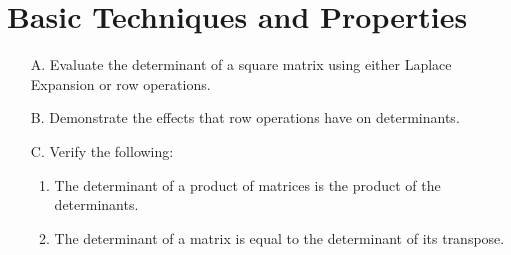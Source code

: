 \section{Basic Techniques and Properties}

\begin{outcome}

\begin{enumerate}
\item[A.] Evaluate the determinant of a square matrix using either Laplace Expansion or row operations.

\item[B.] Demonstrate the effects that row operations have on determinants.

\item[C.] Verify the following:

\begin{enumerate}
\item The determinant of a product of matrices is the product of the
determinants.

\item The determinant of a matrix is equal to the determinant of its
transpose.
\end{enumerate}


\end{enumerate}
\end{outcome}